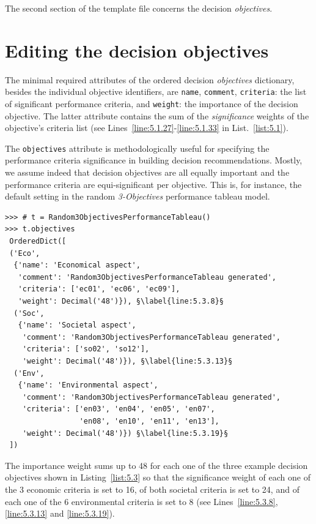 The second section of the template file concerns the decision \emph{objectives}.

\section{Editing the decision objectives}
\label{sec:5.3}

The minimal required attributes of the ordered decision \emph{objectives} dictionary, besides the individual objective identifiers, are \texttt{name}, \texttt{comment}, \texttt{criteria}: the list of significant performance criteria, and \texttt{weight}: the importance of the decision objective. The latter attribute contains the sum of the \emph{significance} weights of the objective's criteria list (see Lines~\ref{line:5.1.27}-\ref{line:5.1.33} in List.~\vref{list:5.1}). 

The \texttt{objectives} attribute is methodologically useful for specifying the performance criteria significance in building decision recommendations. Mostly, we assume indeed that decision objectives are all equally important and the performance criteria are equi-significant per objective. This is, for instance, the default setting in the random \emph{3-Objectives} performance tableau model.
\begin{lstlisting}[caption={Example of decision objectives' description},label=list:5.3]
>>> # t = Random3ObjectivesPerformanceTableau()
>>> t.objectives
 OrderedDict([
 ('Eco',
  {'name': 'Economical aspect',
   'comment': 'Random3ObjectivesPerformanceTableau generated',
   'criteria': ['ec01', 'ec06', 'ec09'],
   'weight': Decimal('48')}), §\label{line:5.3.8}§
  ('Soc',
   {'name': 'Societal aspect',
    'comment': 'Random3ObjectivesPerformanceTableau generated',
    'criteria': ['so02', 'so12'],
    'weight': Decimal('48')}), §\label{line:5.3.13}§
  ('Env',
   {'name': 'Environmental aspect',
    'comment': 'Random3ObjectivesPerformanceTableau generated',
    'criteria': ['en03', 'en04', 'en05', 'en07',
                 'en08', 'en10', 'en11', 'en13'],
    'weight': Decimal('48')}) §\label{line:5.3.19}§
 ])
\end{lstlisting}

The importance weight sums up to 48 for each one of the three example decision objectives shown in Listing~\vref{list:5.3} so that the significance weight of each one of the 3 economic criteria is set to 16, of both societal criteria is set to 24, and of each one of the 6 environmental criteria is set to 8 (see Lines~\ref{line:5.3.8}, \ref{line:5.3.13} and \ref{line:5.3.19}).

